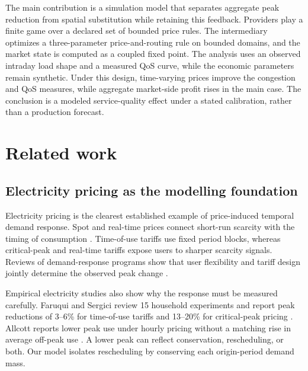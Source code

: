 \documentclass[11pt,a4paper]{article}
\begin{document}
The main contribution is a simulation model that separates aggregate peak reduction from spatial substitution while retaining this feedback. Providers play a finite game over a declared set of bounded price rules. The intermediary optimizes a three-parameter price-and-routing rule on bounded domains, and the market state is computed as a coupled fixed point. The analysis uses an observed intraday load shape and a measured QoS curve, while the economic parameters remain synthetic. Under this design, time-varying prices improve the congestion and QoS measures, while aggregate market-side profit rises in the main case. The conclusion is a modeled service-quality effect under a stated calibration, rather than a production forecast.

\section{Related work}
\label{sec:related}

\subsection{Electricity pricing as the modelling foundation}

Electricity pricing is the clearest established example of price-induced temporal demand response. Spot and real-time prices connect short-run scarcity with the timing of consumption \cite{schweppe1988spot,borenstein2005long}. Time-of-use tariffs use fixed period blocks, whereas critical-peak and real-time tariffs expose users to sharper scarcity signals. Reviews of demand-response programs show that user flexibility and tariff design jointly determine the observed peak change \cite{albadi2008summary,siano2014demand}.

Empirical electricity studies also show why the response must be measured carefully. Faruqui and Sergici review 15 household experiments and report peak reductions of 3--6\% for time-of-use tariffs and 13--20\% for critical-peak pricing \cite{faruqui2010household}. Allcott reports lower peak use under hourly pricing without a matching rise in average off-peak use \cite{allcott2011rethinking}. A lower peak can reflect conservation, rescheduling, or both. Our model isolates rescheduling by conserving each origin-period demand mass.
\end{document}
